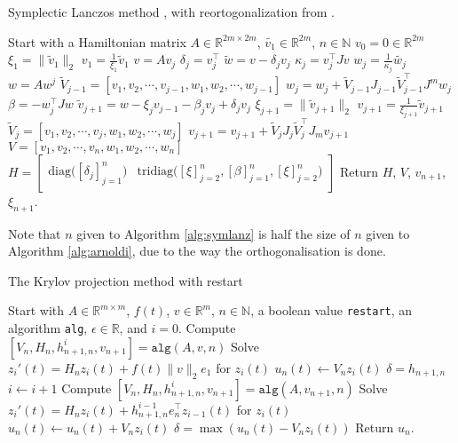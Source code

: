 \begin{algorithm} \caption{Symplectic Lanczos method \cite{SLM}, with reortogonalization from \cite{SLMO}. } \label{alg:symlanz}
\begin{algorithmic}
\STATE Start with a Hamiltonian matrix $A \in \mathbb{R}^{2m \times 2m}$, $\tilde{v_1} \in \mathbb{R}^{2m}$, $n \in \mathbb{N}$
\STATE $v_0= 0 \in \mathbb{R}^{2m}$
\STATE $\xi_1 = \| \tilde{v}_1\|_2$
\STATE $v_1= \frac{1}{\xi_1}  \tilde{v}_1$
	\STATE $v = A v_j$
	\STATE $\delta_j =  v_j^\top$
	\STATE $\tilde{w} = v-\delta_j v_j$
	\STATE $\kappa_j = v_j^\top J v $
	\STATE $w_j = \frac{1}{\kappa_j} \tilde{w_j}$
	\STATE $w = A w^j$
	\STATE $ \tilde{V}_{j-1} = [v_1,v_2,\cdots,v_{j-1},w_1,w_2,\cdots,w_{j-1}] $
	\STATE $ w_j = w_j + \tilde{V}_{j-1}J_{j-1} \tilde{V}_{j-1}^\top J^m w_j $
	\STATE $\beta = -w_j^\top J w$
	\STATE $\tilde{v}_{j+1} = w - \xi_j v_{j-1} - \beta_j v_j + \delta_j v_j$
	\STATE $ \xi_{j+1} = \|\tilde{v}_{j+1} \|_2 $
	\STATE $ v_{j+1} = \frac{1}{\xi_{j+1}} \tilde{v}_{j+1} $
	\STATE $ \tilde{V}_j = [v_1,v_2,\cdots,v_{j},w_1,w_2,\cdots,w_{j}] $
	\STATE $ v_{j+1} = v_{j+1} + \tilde{V}_j J_j \tilde{V}_j^\top J_m v_{j+1} $
\ENDFOR
\STATE $V = [v_1,v_2,\cdots,v_n,w_1,w_2,\cdots,w_n]$
\STATE $H = \begin{bmatrix}
\text{diag} \big( [\delta_j]^n_{j=1} \big) & \text{tridiag}\big( [\xi]_{j=2}^n,[\beta]_{j=1}^n,[\xi]_{j=2}^n \big)
\end{bmatrix} $
\STATE Return $H$, $V$, $v_{n+1}$, $\xi_{n+1}$.
\end{algorithmic}
\end{algorithm}
Note that $n$ given to Algorithm \ref{alg:symlanz} is half the size of $n$ given to Algorithm \ref{alg:arnoldi}, due to the way the orthogonalisation is done.

\begin{algorithm}
\begin{algorithmic} \caption{The Krylov projection method with restart\cite{min}} \label{alg:PM} 
\STATE Start with $A \in \mathbb{R}^{m \times m}$, $f(t)$, $v \in \mathbb{R}^{m}$, $n \in \mathbb{N}$, a boolean value \texttt{restart}, an algorithm \texttt{alg}, $\epsilon \in \mathbb{R}$, and $i = 0$.
\STATE Compute $[V_n,H_n,h_{n+1,n}^i,v_{n+1}] = \texttt{alg}(A,v,n)$
\STATE Solve $  z_i'(t) = H_n z_i(t) + f(t) \| v \|_2 e_1  $ for $z_i(t)$
\STATE $ u_n(t) \leftarrow  V_n z_i(t) $
\STATE $ \delta = h_{n+1,n} $ 
	\WHILE{ $\epsilon < \delta$  } 
    		\STATE $i \leftarrow i + 1$
    		\STATE Compute $[V_n,H_n,h_{n+1,n}^i,v_{n+1}] = \texttt{alg}(A,v_{n+1},n)$
    		\STATE Solve $ z_i'(t) = H_n z_i(t) + h_{n+1,n}^{i-1}e_n^\top z_{i-1}(t)  $ for $z_i(t)$
    		\STATE $ u_n(t) \leftarrow u_n(t) + V_n z_i(t) $
    		\STATE $\delta = \max(u_n(t) - V_n z_i(t))$
	\ENDWHILE
\ENDIF
\STATE Return $u_n$.
\end{algorithmic} 
\end{algorithm}


